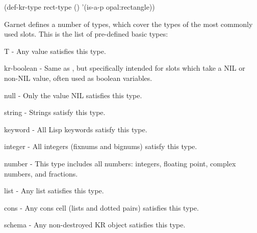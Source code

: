 \vspace{1 line}
\begin{programexample}
(def-kr-type rect-type () '(is-a-p opal:rectangle))
\end{programexample}
\vspace{1 line}

\begin{group}
Garnet defines a number of types, which cover the types of the most
commonly used slots.  This is the list of pre-defined basic types:
\begin{description}
\item[] {\sc T} - Any value satisfies this type.

\item[] {\sc kr-boolean} - Same as , but specifically intended for
slots which take a NIL or non-NIL value, often used as boolean variables.

\item[] {\sc null} - Only the value NIL satisfies this type.

\item[] {\sc string} - Strings satisfy this type.

\item[] {\sc keyword} - All Lisp keywords satisfy this type.

\item[] {\sc integer} - All integers (fixnums and bignums) satisfy this type.

\item[] {\sc number} - This type includes all numbers: integers, floating point,
complex numbers, and fractions.

\item[] {\sc list} - Any list satisfies this type.

\item[] {\sc cons} - Any cons cell (lists and dotted pairs) satisfies this type.

\item[] {\sc schema} - Any non-destroyed KR object satisfies this type.
\end{description}
\end{group}
\vspace{1 line}


